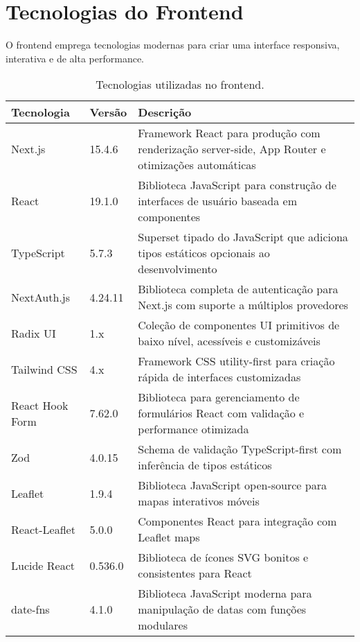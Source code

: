 \section{Tecnologias do Frontend}

O frontend emprega tecnologias modernas para criar uma interface responsiva, interativa e de alta performance.

\begin{table}[H]
  \centering
  \caption{Tecnologias utilizadas no frontend.}
  \label{tab:tecnologias-frontend}
  \begin{tabular}{|p{3cm}|p{2cm}|p{8cm}|}
    \hline
    \textbf{Tecnologia} & \textbf{Versão} & \textbf{Descrição}                                                                               \\
    \hline
    Next.js             & 15.4.6          & Framework React para produção com renderização server-side, App Router e otimizações automáticas \\
    \hline
    React               & 19.1.0          & Biblioteca JavaScript para construção de interfaces de usuário baseada em componentes            \\
    \hline
    TypeScript          & 5.7.3           & Superset tipado do JavaScript que adiciona tipos estáticos opcionais ao desenvolvimento          \\
    \hline
    NextAuth.js         & 4.24.11         & Biblioteca completa de autenticação para Next.js com suporte a múltiplos provedores              \\
    \hline
    Radix UI            & 1.x             & Coleção de componentes UI primitivos de baixo nível, acessíveis e customizáveis                  \\
    \hline
    Tailwind CSS        & 4.x             & Framework CSS utility-first para criação rápida de interfaces customizadas                       \\
    \hline
    React Hook Form     & 7.62.0          & Biblioteca para gerenciamento de formulários React com validação e performance otimizada         \\
    \hline
    Zod                 & 4.0.15          & Schema de validação TypeScript-first com inferência de tipos estáticos                           \\
    \hline
    Leaflet             & 1.9.4           & Biblioteca JavaScript open-source para mapas interativos móveis                                  \\
    \hline
    React-Leaflet       & 5.0.0           & Componentes React para integração com Leaflet maps                                               \\
    \hline
    Lucide React        & 0.536.0         & Biblioteca de ícones SVG bonitos e consistentes para React                                       \\
    \hline
    date-fns            & 4.1.0           & Biblioteca JavaScript moderna para manipulação de datas com funções modulares                    \\
    \hline
  \end{tabular}
\end{table}

